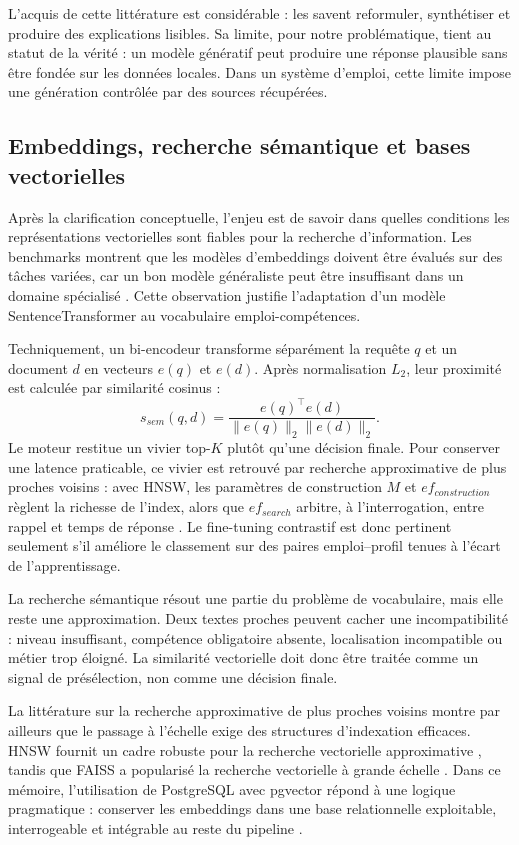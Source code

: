L'acquis de cette littérature est considérable : les \LLM{} savent reformuler, synthétiser et produire des explications lisibles. Sa limite, pour notre problématique, tient au statut de la vérité : un modèle génératif peut produire une réponse plausible sans être fondée sur les données locales. Dans un système d'emploi, cette limite impose une génération contrôlée par des sources récupérées.
\subsection{Embeddings, recherche sémantique et bases vectorielles}

Après la clarification conceptuelle, l'enjeu est de savoir dans quelles conditions les représentations vectorielles sont fiables pour la recherche d'information. Les benchmarks montrent que les modèles d'embeddings doivent être évalués sur des tâches variées, car un bon modèle généraliste peut être insuffisant dans un domaine spécialisé \cite{thakur2021beir,muennighoff2022mteb}. Cette observation justifie l'adaptation d'un modèle SentenceTransformer au vocabulaire emploi-compétences.

Techniquement, un bi-encodeur transforme séparément la requête $q$ et un document $d$ en vecteurs $e(q)$ et $e(d)$. Après normalisation $L_2$, leur proximité est calculée par similarité cosinus :
\[
s_{sem}(q,d)=\frac{e(q)^\top e(d)}{\lVert e(q)\rVert_2\lVert e(d)\rVert_2}.
\]
Le moteur restitue un vivier top-$K$ plutôt qu'une décision finale. Pour conserver une latence praticable, ce vivier est retrouvé par recherche approximative de plus proches voisins : avec HNSW, les paramètres de construction $M$ et $ef_{construction}$ règlent la richesse de l'index, alors que $ef_{search}$ arbitre, à l'interrogation, entre rappel et temps de réponse \cite{malkov2018hnsw,johnson2019faiss}. Le fine-tuning contrastif est donc pertinent seulement s'il améliore le classement sur des paires emploi--profil tenues à l'écart de l'apprentissage.

La recherche sémantique résout une partie du problème de vocabulaire, mais elle reste une approximation. Deux textes proches peuvent cacher une incompatibilité : niveau insuffisant, compétence obligatoire absente, localisation incompatible ou métier trop éloigné. La similarité vectorielle doit donc être traitée comme un signal de présélection, non comme une décision finale.

La littérature sur la recherche approximative de plus proches voisins montre par ailleurs que le passage à l'échelle exige des structures d'indexation efficaces. HNSW fournit un cadre robuste pour la recherche vectorielle approximative \cite{malkov2018hnsw}, tandis que FAISS a popularisé la recherche vectorielle à grande échelle \cite{johnson2019faiss}. Dans ce mémoire, l'utilisation de PostgreSQL avec pgvector répond à une logique pragmatique : conserver les embeddings dans une base relationnelle exploitable, interrogeable et intégrable au reste du pipeline \cite{pgvector2024}.

